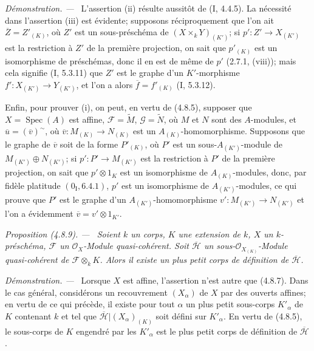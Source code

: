 \documentclass[10pt,oneside]{book}
\newenvironment{proposition}[1][]{%
  \par\medskip\noindent\itshape Proposition (#1). ---\ }{\par}
\newenvironment{proof}{%
  \par\medskip\noindent\textit{Démonstration. ---\ }}{\par}
\begin{document}
\begin{proof}
L'assertion (ii) résulte aussitôt de (I, 4.4.5). La nécessité dans l'assertion
(iii) est évidente; supposons réciproquement que l'on ait
$\overline Z=Z'_{(K)}$, où $Z'$ est un sous-préschéma de
$(X\times_kY)_{(K')}$; si $p':Z'\to X_{(K')}$ est la restriction à $Z'$ de la
première projection, on sait que $p'_{(K)}$ est un isomorphisme de préschémas,
donc il en est de même de $p'$ (2.7.1, (viii)); mais cela signifie (I, 5.3.11)
que $Z'$ est le graphe d'un $K'$-morphisme
$f':X_{(K')}\to Y_{(K')}$, et l'on a alors
$\overline f=f'_{(K)}$ (I, 5.3.12).

Enfin, pour prouver (i), on peut, en vertu de (4.8.5), supposer que
$X=\operatorname{Spec}(A)$ est affine, $\mathscr F=\widetilde M$,
$\mathscr G=\widetilde N$, où $M$ et $N$ sont des $A$-modules, et
$\overline u=(\overline v)^{\sim}$, où
$\overline v:M_{(K)}\to N_{(K)}$ est un $A_{(K)}$-homomorphisme. Supposons
que le graphe de $\overline v$ soit de la forme $P'_{(K)}$, où $P'$ est un
sous-$A_{(K')}$-module de $M_{(K')}\oplus N_{(K')}$; si
$p':P'\to M_{(K')}$ est la restriction à $P'$ de la première projection, on
sait que $p'\otimes1_K$ est un isomorphisme de $A_{(K)}$-modules, donc, par
fidèle platitude $(0_{\mathrm I},6.4.1)$, $p'$ est un isomorphisme de
$A_{(K')}$-modules, ce qui prouve que $P'$ est le graphe d'un
$A_{(K')}$-homomorphisme $v':M_{(K')}\to N_{(K')}$ et l'on a évidemment
$\overline v=v'\otimes1_{K'}$.
\end{proof}

\begin{proposition}[4.8.9]
\label{IV.2.4.8.9-fr}
Soient $k$ un corps, $K$ une extension de $k$, $X$ un $k$-préschéma,
$\mathscr F$ un $\mathcal O_X$-Module quasi-cohérent. Soit $\overline{\mathscr H}$ un
sous-$\mathcal O_{X_{(K)}}$-Module quasi-cohérent de
$\mathscr F\otimes_kK$. Alors il existe un plus petit corps de définition de
$\overline{\mathscr H}$.
\end{proposition}

\begin{proof}
Lorsque $X$ est affine, l'assertion n'est autre que (4.8.7). Dans le cas
général, considérons un recouvrement $(X_\alpha)$ de $X$ par des ouverts
affines; en vertu de ce qui précède, il existe pour tout $\alpha$ un plus petit
sous-corps $K'_\alpha$ de $K$ contenant $k$ et tel que
$\overline{\mathscr H}|(X_\alpha)_{(K)}$ soit défini sur $K'_\alpha$. En vertu de
(4.8.5), le sous-corps de $K$ engendré par les $K'_\alpha$ est le plus petit
corps de définition de $\overline{\mathscr H}$.
\end{proof}
\end{document}
